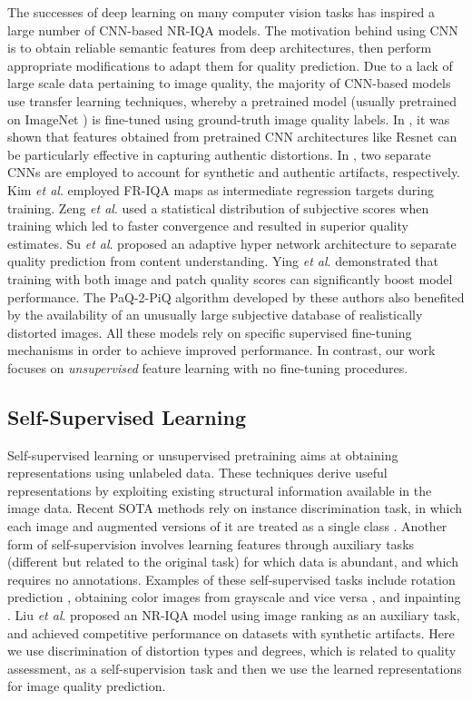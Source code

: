 \documentclass[journal]{IEEEtran}
\newcommand{\etal}{\textit{et al}. }
\begin{document}
The successes of deep learning on many computer vision tasks \cite{he2016deep,he2017mask,sun2018pwc} has inspired a large number of CNN-based NR-IQA models. The motivation behind using CNN is to obtain reliable semantic features from deep architectures, then perform appropriate modifications to adapt them for quality prediction. Due to a lack of large scale data pertaining to image quality, the majority of CNN-based models use transfer learning techniques, whereby a pretrained model (usually pretrained on ImageNet \cite{russakovsky2015imagenet}) is fine-tuned using ground-truth image quality labels. In \cite{kim2017deep}, it was shown that features obtained from pretrained CNN architectures like Resnet \cite{he2016deep} can be particularly effective in capturing authentic distortions. In \cite{zhang2018blind}, two separate CNNs are employed to account for synthetic and authentic artifacts, respectively. Kim \etal \cite{kim2016fully} employed FR-IQA maps as intermediate regression targets during training. Zeng \etal \cite{zeng2017probabilistic} used a statistical distribution of subjective scores when training which led to faster convergence and resulted in superior quality estimates. Su \etal \cite{su2020blindly} proposed an adaptive hyper network architecture to separate quality prediction from content understanding. Ying \etal \cite{ying2019patches} demonstrated that training with both image and patch quality scores can significantly boost model performance. The PaQ-2-PiQ algorithm developed by these authors also benefited by the availability of an unusually large subjective database of realistically distorted images. All these models rely on specific supervised fine-tuning mechanisms in order to achieve improved performance. In contrast, our work focuses on \textit{unsupervised} feature learning with no fine-tuning procedures.

\subsection{Self-Supervised Learning}
Self-supervised learning or unsupervised pretraining aims at obtaining representations using unlabeled data. These techniques derive useful representations by exploiting existing structural information available in the image data. Recent SOTA methods rely on instance discrimination task, in which each image and augmented versions of it are treated as a single class \cite{dosovitskiy2014discriminative,chen2020simple,he2020momentum}. Another form of self-supervision involves learning features through auxiliary tasks (different but related to the original task) for which data is abundant, and which requires no annotations. Examples of these self-supervised tasks include rotation prediction \cite{gidaris2018unsupervised}, obtaining color images from grayscale and vice versa \cite{zhang2016colorful,larsson2017colorization}, and inpainting \cite{pathak2016context}. Liu \etal \cite{liu2019exploiting} proposed an NR-IQA model using image ranking as an auxiliary task, and achieved competitive performance on datasets with synthetic artifacts. Here we use discrimination of distortion types and degrees, which is related to quality assessment, as a self-supervision task and then we use the learned representations for image quality prediction.
\end{document}
